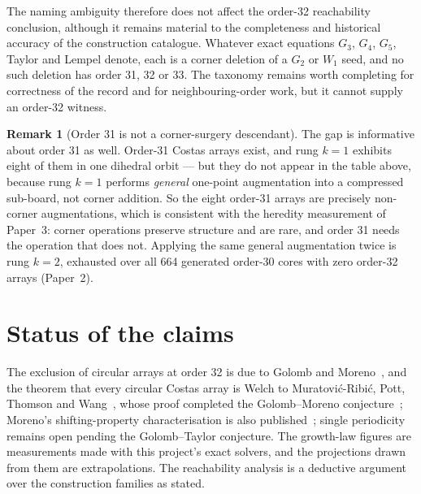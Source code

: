 \documentclass[11pt,a4paper,oneside]{report}
\theoremstyle{definition}
\newtheorem{remark}[theorem]{Remark}
\begin{document}
The naming ambiguity therefore does not affect the order-32 reachability conclusion, although it remains material to the completeness and historical accuracy of the construction catalogue. Whatever exact
equations $G_3$, $G_4$, $G_5$, Taylor and Lempel denote, each is a corner
deletion of a $G_2$ or $W_1$ seed, and no such deletion has order 31, 32 or 33.
The taxonomy remains worth completing for correctness of the record and for
neighbouring-order work, but it cannot supply an order-32 witness.

\begin{remark}[Order 31 is not a corner-surgery descendant]
The gap is informative about order 31 as well. Order-31 Costas arrays exist, and
rung $k=1$ exhibits eight of them in one dihedral orbit --- but they do not appear
in the table above, because rung $k=1$ performs \emph{general} one-point
augmentation into a compressed sub-board, not corner addition. So the eight
order-31 arrays are precisely non-corner augmentations, which is consistent with the heredity measurement of Paper~3: corner operations preserve structure and are rare,
and order 31 needs the operation that does not. Applying the same general
augmentation twice is rung $k=2$, exhausted over all 664 generated order-30 cores
with zero order-32 arrays (Paper~2).
\end{remark}


\section{Status of the claims}\label{p1-sec:status}
The exclusion of circular arrays at order 32 is due to Golomb and Moreno~\cite{p1-golombmoreno}, and
the theorem that every circular Costas array is Welch to Muratovi\'c-Ribi\'c, Pott, Thomson and
Wang~\cite{p1-mpttw2015}, whose proof completed the Golomb--Moreno conjecture~\cite{p1-torresrubio2023};
Moreno's shifting-property characterisation is also published~\cite{p1-moreno92}; single periodicity remains open
pending the Golomb--Taylor conjecture. The growth-law figures are measurements made with this
project's exact solvers, and the projections drawn from them are extrapolations. The reachability
analysis is a deductive argument over the construction families as stated.
\end{document}
